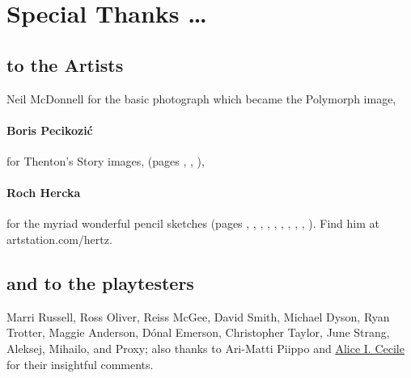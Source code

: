 \section*{Special Thanks \ldots}

\begin{multicols}{2}

\subsection*{to the Artists}

Neil McDonnell for the basic photograph which became the Polymorph image,

\paragraph{Boris Pecikozi\'c} for Thenton's Story images, (pages 
\pageref{boris:jump}, 
\pageref{boris:brawl}, 
\pageref{boris:meet}), 


\paragraph{Roch Hercka} for the myriad wonderful pencil sketches (pages 
\pageref{roch:races}, 
\pageref{roch:dwarf}, 
\pageref{roch:stances}, 
\pageref{roch:vitals}, 
\pageref{roch:xp1}, 
\pageref{roch:xp2}, 
\pageref{roch:enchanter}, 
\pageref{roch:polymorph}, 
\pageref{roch:runes}, 
\pageref{roch:light}
).
Find him at artstation.com/hertz.

\subsection*{and to the playtesters} Marri Russell, Ross Oliver, Reiss McGee, David Smith, Michael Dyson, Ryan Trotter, Maggie Anderson, 
D\'{o}nal Emerson, Christopher Taylor, June Strang, 
Aleksej, Mihailo, and Proxy;
also thanks to Ari-Matti Piippo and \href{https://www.twitter.com/AliceICecile}{Alice I. Cecile} for their insightful comments.

\end{multicols}

